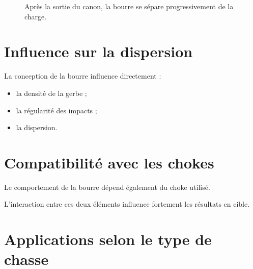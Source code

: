 \begin{figure}[htbp]
\centering


\caption{Après la sortie du canon, la bourre se sépare progressivement de la charge.}
\label{fig:separation_bourre}

\end{figure}

\section{Influence sur la dispersion}

La conception de la bourre influence directement :

\begin{itemize}
    \item la densité de la gerbe ;
    \item la régularité des impacts ;
    \item la dispersion.
\end{itemize}

\section{Compatibilité avec les chokes}

Le comportement de la bourre dépend également du choke utilisé.

L'interaction entre ces deux éléments influence fortement les résultats en
cible.

\section{Applications selon le type de chasse}

